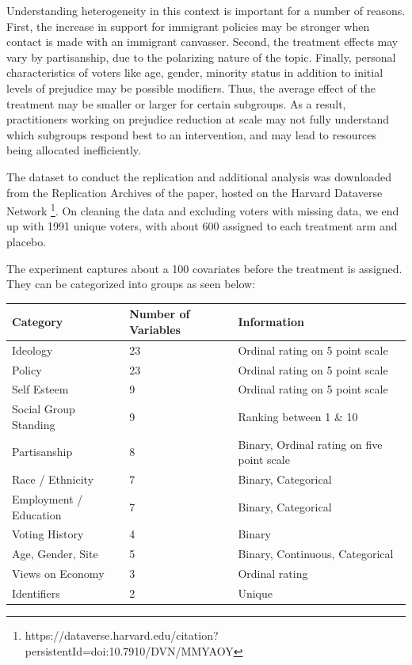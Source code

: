 \documentclass[11pt]{article}
\theoremstyle{plain}
\theoremstyle{definition}
\theoremstyle{plain}
\begin{document}
Understanding heterogeneity in this context is important for a number of reasons. First, the increase in support for immigrant policies may be stronger when contact is made with an immigrant canvasser. Second, the treatment effects may vary by partisanship, due to the polarizing nature of the topic. Finally, personal characteristics of voters like age, gender, minority status in addition to initial levels of prejudice may be possible modifiers. Thus, the average effect of the treatment may be smaller or larger for certain subgroups. As a result, practitioners working on prejudice reduction at scale may not fully understand which subgroups respond best to an intervention, and may lead to resources being allocated inefficiently. 

The dataset to conduct the replication and additional analysis was downloaded from the Replication Archives of the paper, hosted on the Harvard Dataverse Network \footnote{https://dataverse.harvard.edu/citation?persistentId=doi:10.7910/DVN/MMYAOY}. On cleaning the data and excluding voters with missing data, we end up with 1991 unique voters, with about 600 assigned to each treatment arm and placebo. 

The experiment captures about a 100 covariates before the treatment is assigned. They can be categorized into groups as seen below: 

\begin{center}
\begin{tabular}{|l|l|l|}
\hline
\textbf{Category} & \textbf{Number of Variables} & \textbf{Information} \\
\hline
Ideology & 23 & Ordinal rating on 5 point scale \\
\hline
Policy & 23 & Ordinal rating on 5 point scale \\
\hline
Self Esteem & 9 & Ordinal rating on 5 point scale \\
\hline
Social Group Standing & 9 & Ranking between 1 \& 10 \\
\hline
Partisanship & 8 & Binary, Ordinal rating on five point scale \\
\hline
Race / Ethnicity & 7 & Binary, Categorical \\
\hline
Employment / Education & 7 & Binary, Categorical \\
\hline
Voting History & 4 & Binary \\
\hline
Age, Gender, Site & 5 & Binary, Continuous, Categorical \\
\hline
Views on Economy & 3 & Ordinal rating \\
\hline
Identifiers & 2 & Unique \\
\hline
\end{tabular}
\end{center}
\end{document}
